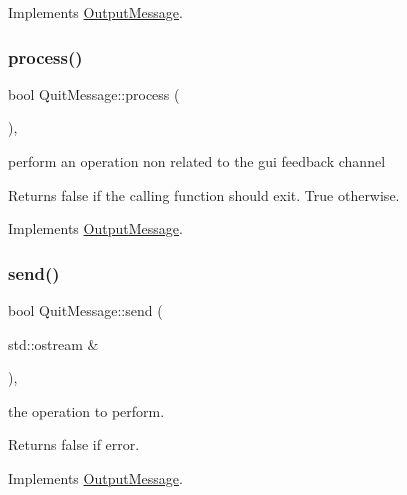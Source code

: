 Implements \mbox{\hyperlink{class_output_message_adfc965910862cd236e437e3050aee176}{Output\+Message}}.

\mbox{\label{class_quit_message_a780765be639ff408f1d1acf2f5eef851}} 
\subsubsection{\texorpdfstring{process()}{process()}}
{\footnotesize\ttfamily bool Quit\+Message\+::process (\begin{DoxyParamCaption}{ }\end{DoxyParamCaption})\hspace{0.3cm}{\ttfamily [inline]}, {\ttfamily [virtual]}}



perform an operation non related to the gui feedback channel 

\begin{DoxyReturn}{Returns}
false if the calling function should exit. True otherwise. 
\end{DoxyReturn}


Implements \mbox{\hyperlink{class_output_message_a949d8350d98202608e4248fe6dafa10f}{Output\+Message}}.

\mbox{\label{class_quit_message_ae1039b9a8fc00712a8161a3701f1fa2f}} 
\subsubsection{\texorpdfstring{send()}{send()}}
{\footnotesize\ttfamily bool Quit\+Message\+::send (\begin{DoxyParamCaption}\item[{std\+::ostream \&}]{ }\end{DoxyParamCaption})\hspace{0.3cm}{\ttfamily [inline]}, {\ttfamily [virtual]}}



the operation to perform. 

\begin{DoxyReturn}{Returns}
false if error. 
\end{DoxyReturn}


Implements \mbox{\hyperlink{class_output_message_a6f817de4d3430dc98521431385b95328}{Output\+Message}}.


